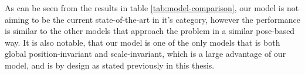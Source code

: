 As can be seen from the results in table \ref{tab:model-comparison}, our model is not aiming to be the current state-of-the-art in it's category, however the performance is similar to the other models that approach the problem in a similar pose-based way. It is also notable, that our model is one of the only models that is both global position-invariant and scale-invariant, which is a large advantage of our model, and is by design as stated previously in this thesis.